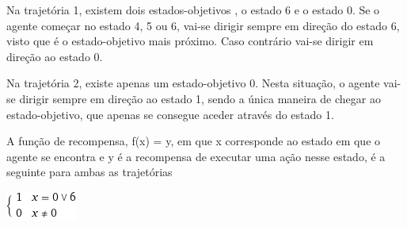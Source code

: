 \documentclass[11pt,twocolumn]{article}
\begin{document}
Na trajetória 1, existem dois estados-objetivos , o estado 6 e o estado 0. Se o agente começar no estado 4, 5 ou 6, vai-se dirigir
sempre em direção do estado 6, visto que é o estado-objetivo mais próximo. Caso contrário vai-se dirigir em direção ao estado 0.

Na trajetória 2, existe apenas um estado-objetivo 0. Nesta situação, o agente vai-se dirigir sempre em direção ao estado 1,
sendo a única maneira de chegar ao estado-objetivo, que apenas se consegue aceder através do estado 1.

A função de recompensa, f(x) = y, em que x corresponde ao estado em que o agente se encontra e y é a recompensa de executar uma ação nesse estado,
é a seguinte para ambas as trajetórias\par

\begin{center}
    \includegraphics[scale=0.6]{piece1.png}
\end{center}
\end{document}

